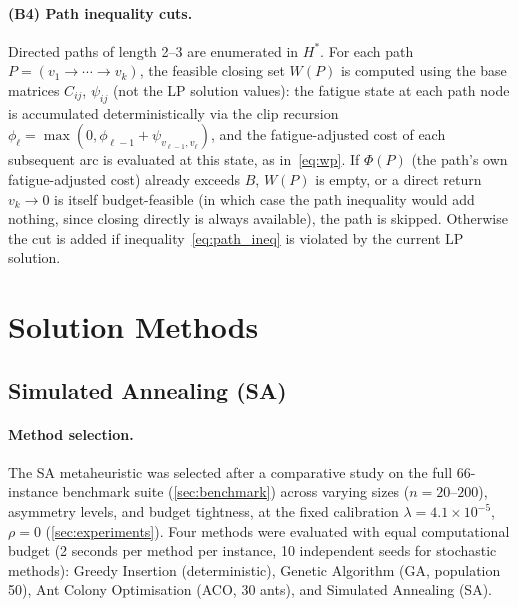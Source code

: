 \documentclass[11pt,a4paper]{article}
\begin{document}
\paragraph{(B4) Path inequality cuts.}
Directed paths of length 2--3 are enumerated in $H^*$.
For each path $P = (v_1 \to \cdots \to v_k)$, the feasible closing set $W(P)$ is computed using the base matrices $C_{ij}$, $\psi_{ij}$ (not the LP solution values): the fatigue state at each path node is accumulated deterministically via the clip recursion $\phi_\ell = \max(0, \phi_{\ell-1} + \psi_{v_{\ell-1},v_\ell})$, and the fatigue-adjusted cost of each subsequent arc is evaluated at this state, as in~\eqref{eq:wp}.
If $\Phi(P)$ (the path's own fatigue-adjusted cost) already exceeds $B$, $W(P)$ is empty, or a direct return $v_k \to 0$ is itself budget-feasible (in which case the path inequality would add nothing, since closing directly is always available), the path is skipped.
Otherwise the cut is added if inequality~\eqref{eq:path_ineq} is violated by the current LP solution.

\section{Solution Methods}
\label{sec:methods}

\subsection{Simulated Annealing (SA)}
\label{sec:sa}

\paragraph{Method selection.}
The SA metaheuristic was selected after a comparative study on the full 66-instance benchmark suite (\cref{sec:benchmark}) across varying sizes ($n = 20$--$200$), asymmetry levels, and budget tightness, at the fixed calibration $\lambda = 4.1\times10^{-5}$, $\rho = 0$ (\cref{sec:experiments}).
Four methods were evaluated with equal computational budget (2 seconds per method per instance, 10 independent seeds for stochastic methods): Greedy Insertion (deterministic), Genetic Algorithm (GA, population 50), Ant Colony Optimisation (ACO, 30 ants), and Simulated Annealing (SA).
\end{document}
